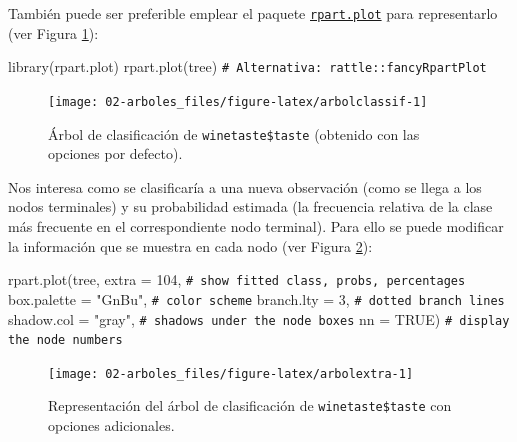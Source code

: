 \documentclass[
]{book}
\newenvironment{Shaded}{\begin{snugshade}}{\end{snugshade}}
\newcommand{\AttributeTok}[1]{\textcolor[rgb]{0.77,0.63,0.00}{#1}}
\newcommand{\CommentTok}[1]{\textcolor[rgb]{0.56,0.35,0.01}{\textit{#1}}}
\newcommand{\ConstantTok}[1]{\textcolor[rgb]{0.00,0.00,0.00}{#1}}
\newcommand{\DecValTok}[1]{\textcolor[rgb]{0.00,0.00,0.81}{#1}}
\newcommand{\FunctionTok}[1]{\textcolor[rgb]{0.00,0.00,0.00}{#1}}
\newcommand{\NormalTok}[1]{#1}
\newcommand{\StringTok}[1]{\textcolor[rgb]{0.31,0.60,0.02}{#1}}
\theoremstyle{break}
\theoremstyle{nonumberplain}
\renewcommand{\CommentTok}[1]{\textcolor[rgb]{0.41,0.41,0.41}{\texttt{#1}}}
\begin{document}
También puede ser preferible emplear el paquete \href{https://CRAN.R-project.org/package=rpart.plot}{\texttt{rpart.plot}} para representarlo (ver Figura \ref{fig:arbolclassif}):



\begin{Shaded}
\begin{Highlighting}[]
\FunctionTok{library}\NormalTok{(rpart.plot)}
\FunctionTok{rpart.plot}\NormalTok{(tree) }\CommentTok{\# Alternativa: rattle::fancyRpartPlot}
\end{Highlighting}
\end{Shaded}

\begin{figure}[!htb]

{\centering \texttt{[image: 02-arboles\_files/figure-latex/arbolclassif-1]} 

}

\caption{Árbol de clasificación de \texttt{winetaste\$taste} (obtenido con las opciones por defecto).}\label{fig:arbolclassif}
\end{figure}

Nos interesa como se clasificaría a una nueva observación (como se llega a los nodos terminales) y su probabilidad estimada (la frecuencia relativa de la clase más frecuente en el correspondiente nodo terminal).
Para ello se puede modificar la información que se muestra en cada nodo (ver Figura \ref{fig:arbolextra}):



\begin{Shaded}
\begin{Highlighting}[]
\FunctionTok{rpart.plot}\NormalTok{(tree, }
           \AttributeTok{extra =} \DecValTok{104}\NormalTok{,          }\CommentTok{\# show fitted class, probs, percentages}
           \AttributeTok{box.palette =} \StringTok{"GnBu"}\NormalTok{, }\CommentTok{\# color scheme}
           \AttributeTok{branch.lty =} \DecValTok{3}\NormalTok{,       }\CommentTok{\# dotted branch lines}
           \AttributeTok{shadow.col =} \StringTok{"gray"}\NormalTok{,  }\CommentTok{\# shadows under the node boxes}
           \AttributeTok{nn =} \ConstantTok{TRUE}\NormalTok{)            }\CommentTok{\# display the node numbers }
\end{Highlighting}
\end{Shaded}

\begin{figure}[!htb]

{\centering \texttt{[image: 02-arboles\_files/figure-latex/arbolextra-1]} 

}

\caption{Representación del árbol de clasificación de \texttt{winetaste\$taste} con opciones adicionales.}\label{fig:arbolextra}
\end{figure}
\end{document}
